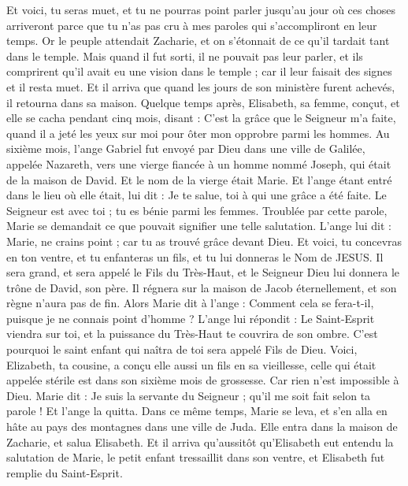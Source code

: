 \begin{multicols}{2}
Et voici, tu seras muet, et tu ne pourras point parler jusqu'au jour où ces choses arriveront parce que tu n'as pas cru à mes paroles qui s'accompliront en leur temps.
Or le peuple attendait Zacharie, et on s'étonnait de ce qu'il tardait tant dans le temple.
Mais quand il fut sorti, il ne pouvait pas leur parler, et ils comprirent qu'il avait eu une vision dans le temple ; car il leur faisait des signes et il resta muet.
Et il arriva que quand les jours de son ministère furent achevés, il retourna dans sa maison.
Quelque temps après, Elisabeth, sa femme, conçut, et elle se cacha pendant cinq mois, disant :
C’est la grâce que le Seigneur m’a faite, quand il a jeté les yeux sur moi pour ôter mon opprobre parmi les hommes.
Au sixième mois, l’ange Gabriel fut envoyé par Dieu dans une ville de Galilée, appelée Nazareth,
vers une vierge fiancée à un homme nommé Joseph, qui était de la maison de David. Et le nom de la vierge était Marie.
Et l'ange étant entré dans le lieu où elle était, lui dit : Je te salue, toi à qui une grâce a été faite. Le Seigneur est avec toi ; tu es bénie parmi les femmes.
Troublée par cette parole, Marie se demandait ce que pouvait signifier une telle salutation.
L’ange lui dit : Marie, ne crains point ; car tu as trouvé grâce devant Dieu.
Et voici, tu concevras en ton ventre, et tu enfanteras un fils, et tu lui donneras le Nom de JESUS.
Il sera grand, et sera appelé le Fils du Très-Haut, et le Seigneur Dieu lui donnera le trône de David, son père.
Il régnera sur la maison de Jacob éternellement, et son règne n’aura pas de fin.
Alors Marie dit à l'ange : Comment cela se fera-t-il, puisque je ne connais point d’homme ?
L’ange lui répondit : Le Saint-Esprit viendra sur toi, et la puissance du Très-Haut te couvrira de son ombre. C’est pourquoi le saint enfant qui naîtra de toi sera appelé Fils de Dieu.
Voici, Elizabeth, ta cousine, a conçu elle aussi un fils en sa vieillesse, celle qui était appelée stérile est dans son sixième mois de grossesse.
Car rien n’est impossible à Dieu.
Marie dit : Je suis la servante du Seigneur ; qu'il me soit fait selon ta parole ! Et l'ange la quitta.
Dans ce même temps, Marie se leva, et s'en alla en hâte au pays des montagnes dans une ville de Juda.
Elle entra dans la maison de Zacharie, et salua Elisabeth.
Et il arriva qu'aussitôt qu'Elisabeth eut entendu la salutation de Marie, le petit enfant tressaillit dans son ventre, et Elisabeth fut remplie du Saint-Esprit.

\end{multicols}
